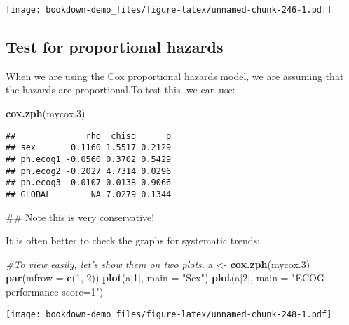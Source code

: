\documentclass[]{book}
\newenvironment{Shaded}{\begin{snugshade}}{\end{snugshade}}
\newcommand{\KeywordTok}[1]{\textcolor[rgb]{0.13,0.29,0.53}{\textbf{#1}}}
\newcommand{\DataTypeTok}[1]{\textcolor[rgb]{0.13,0.29,0.53}{#1}}
\newcommand{\DecValTok}[1]{\textcolor[rgb]{0.00,0.00,0.81}{#1}}
\newcommand{\StringTok}[1]{\textcolor[rgb]{0.31,0.60,0.02}{#1}}
\newcommand{\CommentTok}[1]{\textcolor[rgb]{0.56,0.35,0.01}{\textit{#1}}}
\newcommand{\NormalTok}[1]{#1}
\theoremstyle{definition}
\theoremstyle{definition}
\theoremstyle{definition}
\theoremstyle{remark}
\begin{document}
\texttt{[image: bookdown-demo\_files/figure-latex/unnamed-chunk-246-1.pdf]}

\subsection{Test for proportional
hazards}\label{test-for-proportional-hazards}

When we are using the Cox proportional hazards model, we are assuming
that the hazards are proportional.To test this, we can use:

\begin{Shaded}
\begin{Highlighting}[]
\KeywordTok{cox.zph}\NormalTok{(mycox.}\DecValTok{3}\NormalTok{)}
\end{Highlighting}
\end{Shaded}

\begin{verbatim}
##              rho  chisq      p
## sex       0.1160 1.5517 0.2129
## ph.ecog1 -0.0560 0.3702 0.5429
## ph.ecog2 -0.2027 4.7314 0.0296
## ph.ecog3  0.0107 0.0138 0.9066
## GLOBAL        NA 7.0279 0.1344
\end{verbatim}

\begin{Shaded}
\begin{Highlighting}[]
\NormalTok{## Note this is very conservative!}
\end{Highlighting}
\end{Shaded}

It is often better to check the graphs for systematic trends:

\begin{Shaded}
\begin{Highlighting}[]
\CommentTok{#To view easily, let’s show them on two plots.}
\NormalTok{a <-}\StringTok{ }\KeywordTok{cox.zph}\NormalTok{(mycox.}\DecValTok{3}\NormalTok{)}
\KeywordTok{par}\NormalTok{(}\DataTypeTok{mfrow =} \KeywordTok{c}\NormalTok{(}\DecValTok{1}\NormalTok{, }\DecValTok{2}\NormalTok{))}
\KeywordTok{plot}\NormalTok{(a[}\DecValTok{1}\NormalTok{], }\DataTypeTok{main =} \StringTok{"Sex"}\NormalTok{)}
\KeywordTok{plot}\NormalTok{(a[}\DecValTok{2}\NormalTok{], }\DataTypeTok{main =} \StringTok{"ECOG performance score=1"}\NormalTok{)}
\end{Highlighting}
\end{Shaded}

\texttt{[image: bookdown-demo\_files/figure-latex/unnamed-chunk-248-1.pdf]}
\end{document}
